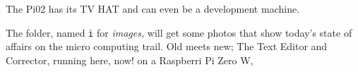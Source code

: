
The Pi02 has its TV HAT and can even be a development machine. %

The folder, named {\tt i} for {\it images,} will get some photos that show today's
state of affairs on the micro computing trail.  Old meets new; The Text Editor and
Corrector, running here, now! on a Raspberri Pi Zero W, %

\bye
